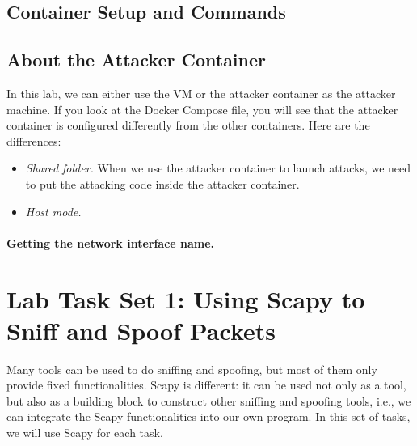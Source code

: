\subsection{Container Setup and Commands} 




\subsection{About the Attacker Container}

In this lab, we can either use the VM or the attacker container
as the attacker machine. If you look at the Docker Compose file, you will
see that the attacker container is configured differently from the other
containers. Here are the differences:


\begin{itemize}
\item \textit{Shared folder.} When we use the attacker container
to launch attacks, we need to put the attacking code inside
the attacker container.



\item \textit{Host mode.}

\end{itemize}


\paragraph{Getting the network interface name.}




\section{Lab Task Set 1: Using Scapy to Sniff and Spoof Packets}


Many tools can be used to do sniffing and spoofing, but most of them only provide 
fixed functionalities. Scapy is different: it can be used not only as a tool, 
but also as a building block to construct other sniffing and spoofing
tools, i.e., we can integrate the Scapy functionalities into our own
program.  In this set of tasks, we will use Scapy for each task. 



